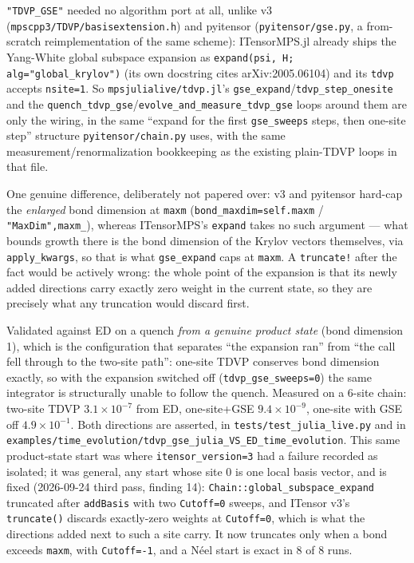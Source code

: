 \documentclass[11pt]{article}
\begin{document}
\lstinline|"TDVP_GSE"| needed no algorithm port at all, unlike v3
(\texttt{mpscpp3/TDVP/basisextension.h}) and pyitensor
(\texttt{pyitensor/gse.py}, a from-scratch reimplementation of the same
scheme): ITensorMPS.jl already ships the Yang-White global subspace
expansion as \lstinline|expand(psi, H; alg="global_krylov")| (its own
docstring cites arXiv:2005.06104) and its \lstinline|tdvp| accepts
\lstinline|nsite=1|. So \texttt{mpsjulialive/tdvp.jl}'s
\lstinline|gse_expand|/\lstinline|tdvp_step_onesite| and the
\lstinline|quench_tdvp_gse|/\lstinline|evolve_and_measure_tdvp_gse| loops
around them are only the wiring, in the same ``expand for the first
\lstinline|gse_sweeps| steps, then one-site step'' structure
\texttt{pyitensor/chain.py} uses, with the same
measurement/renormalization bookkeeping as the existing plain-TDVP loops
in that file.

One genuine difference, deliberately not papered over: v3 and pyitensor
hard-cap the \emph{enlarged} bond dimension at \lstinline|maxm|
(\lstinline|bond_maxdim=self.maxm| / \lstinline|"MaxDim",maxm_|), whereas
ITensorMPS's \lstinline|expand| takes no such argument --- what bounds
growth there is the bond dimension of the Krylov vectors themselves, via
\lstinline|apply_kwargs|, so that is what \lstinline|gse_expand| caps at
\lstinline|maxm|. A \lstinline|truncate!| after the fact would be
actively wrong: the whole point of the expansion is that its newly added
directions carry exactly zero weight in the current state, so they are
precisely what any truncation would discard first.

Validated against ED on a quench \emph{from a genuine product state}
(bond dimension 1), which is the configuration that separates ``the
expansion ran'' from ``the call fell through to the two-site path'':
one-site TDVP conserves bond dimension exactly, so with the expansion
switched off (\lstinline|tdvp_gse_sweeps=0|) the same integrator is
structurally unable to follow the quench. Measured on a 6-site chain:
two-site TDVP $3.1\times10^{-7}$ from ED, one-site+GSE
$9.4\times10^{-9}$, one-site with GSE off $4.9\times10^{-1}$. Both
directions are asserted, in \texttt{tests/test\_julia\_live.py} and in
\texttt{examples/time\_evolution/tdvp\_gse\_julia\_VS\_ED\_time\_evolution}.
This same product-state start was where \lstinline|itensor_version=3|
had a failure recorded as isolated; it was general, any start whose site
0 is one local basis vector, and is fixed (2026-09-24 third pass, finding
14): \texttt{Chain::global\_subspace\_expand} truncated after
\texttt{addBasis} with two \texttt{Cutoff=0} sweeps, and ITensor v3's
\texttt{truncate()} discards exactly-zero weights at \texttt{Cutoff=0},
which is what the directions added next to such a site carry. It now
truncates only when a bond exceeds \texttt{maxm}, with \texttt{Cutoff=-1},
and a N\'eel start is exact in 8 of 8 runs.
\end{document}
